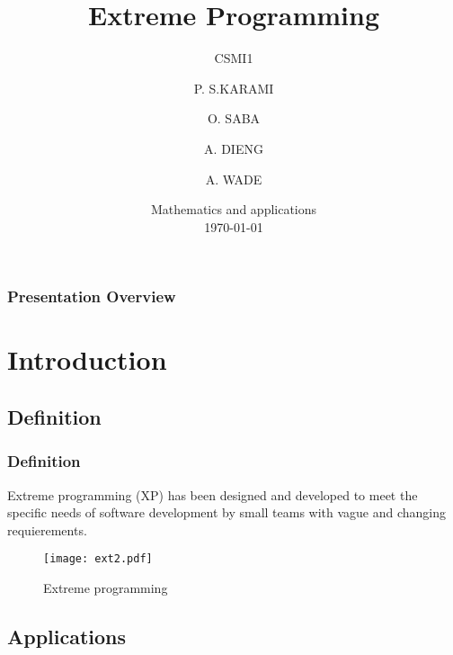 \documentclass[	11pt, ]{beamer}
\title{Extreme Programming}
\subtitle{CSMI1}
\author[S.KARAMI \and SABA \and ADIENG \and WADE]{P. S.KARAMI \and O. SABA \and A. DIENG \and A. WADE}
\institute[]{University of Strasbourg \\ \smallskip} %
\date[\today]{Mathematics and applications \\ \today} %
\begin{document}

\begin{frame}
	\titlepage %
\end{frame}


\begin{frame}
	\frametitle{Presentation Overview} %
	
	\tableofcontents 
\end{frame}


\section{Introduction}


\subsection{Definition}

\begin{frame}
	\frametitle{Definition}
	
	Extreme programming (XP) has been designed and developed to meet the specific needs of software development by small teams with vague and changing requierements.	
	\bigskip %
	\begin{figure}
		\texttt{[image: ext2.pdf]}
		\caption{Extreme programming}
	\end{figure}

\end{frame}

\subsection{Applications}
\end{document}
